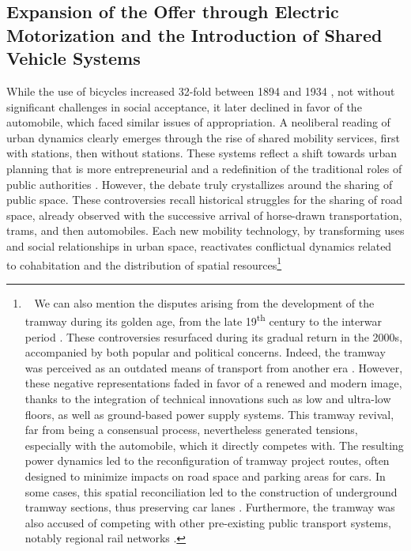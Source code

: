 \begin{refsegment}
\subsection{Expansion of the Offer through Electric Motorization and the Introduction of Shared Vehicle Systems
    \label{chap1:velo-micromobilite-innovations}
    }

While the use of bicycles increased 32-fold between 1894 and 1934 \textcolor{blue}{\autocite[139]{orselli_usages_2008}}, not without significant challenges in social acceptance, it later declined in favor of the automobile, which faced similar issues of appropriation. A neoliberal reading of urban dynamics clearly emerges through the rise of shared mobility services, first with stations, then without stations. These systems reflect a shift towards urban planning that is more entrepreneurial and a redefinition of the traditional roles of public authorities \textcolor{blue}{\autocites[169]{delaunay_mobilites_2017}{frotey_maxime_2017}}. However, the debate truly crystallizes around the sharing of public space. These controversies recall historical struggles for the sharing of road space, already observed with the successive arrival of horse-drawn transportation, trams, and then automobiles. Each new mobility technology, by transforming uses and social relationships in urban space, reactivates conflictual dynamics related to cohabitation and the distribution of spatial resources\footnote{~
    We can also mention the disputes arising from the development of the tramway during its golden age, from the late 19\textsuperscript{th} century to the interwar period \textcolor{blue}{\autocite[281]{flonneau_concurrence_2007}}. These controversies resurfaced during its gradual return in the 2000s, accompanied by both popular and political concerns. Indeed, the tramway was perceived as an outdated means of transport from another era \textcolor{blue}{\autocite[110]{gardon__2014}}. However, these negative representations faded in favor of a renewed and modern image, thanks to the integration of technical innovations such as low and ultra-low floors, as well as ground-based power supply systems. This tramway revival, far from being a consensual process, nevertheless generated tensions, especially with the automobile, which it directly competes with. The resulting power dynamics led to the reconfiguration of tramway project routes, often designed to minimize impacts on road space and parking areas for cars. In some cases, this spatial reconciliation led to the construction of underground tramway sections, thus preserving car lanes \textcolor{blue}{\autocite[10]{richer_tramways_2012}}. Furthermore, the tramway was also accused of competing with other pre-existing public transport systems, notably regional rail networks \textcolor{blue}{\autocite[36]{cete_nord_picardie_evaluer_2013}}.
}
\end{refsegment}

